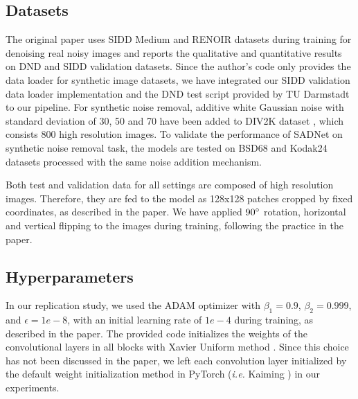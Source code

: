  \subsection{Datasets}
The original paper uses SIDD Medium \cite{SIDD_2018_CVPR} and RENOIR \cite{BLP:journals/corr/AnayaB14} datasets during training for denoising real noisy images and reports the qualitative and quantitative results on DND \cite{8099777} and SIDD validation \cite{SIDD_2018_CVPR} datasets. Since the author's code only provides the data loader for synthetic image datasets, we have integrated our SIDD validation data loader implementation and the DND test script provided by TU Darmstadt \cite{8099777} to our pipeline. For synthetic noise removal, additive white Gaussian noise with standard deviation of 30, 50 and 70 have been added to DIV2K dataset \cite{Agustsson_2017_CVPR_Workshops}, which consists 800 high resolution images. To validate the performance of SADNet on synthetic noise removal task, the models are tested on BSD68 \cite{937655} and Kodak24 datasets processed with the same noise addition mechanism.
 
Both test and validation data for all settings are composed of high resolution images. Therefore, they are fed to the model as 128x128 patches cropped by fixed coordinates, as described in the paper. We have applied $90\degree$ rotation, horizontal and vertical flipping to the images during training, following the practice in the paper.




\subsection{Hyperparameters}

In our replication study, we used the ADAM optimizer \cite{kingma:adam} with $ \beta_{1} = 0.9$, $ \beta_{2} = 0.999$, and $\epsilon = 1e-8$, with an initial learning rate of $1e-4$ during training, as described in the paper. The provided code initializes the weights of the convolutional layers in all blocks with Xavier Uniform method \cite{Glorot2010UnderstandingTD}. Since this choice has not been discussed in the paper, we left each convolution layer initialized by the default weight initialization method in PyTorch (\textit{i.e.} Kaiming \cite{He2015DelvingDI}) in our experiments.


